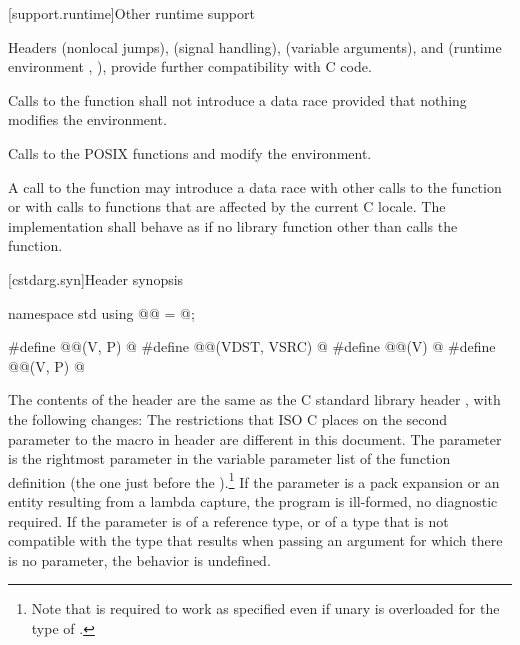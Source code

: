 [support.runtime]{Other runtime support}

\pnum
{}%
%
%
%
%
%
%
Headers
 (nonlocal jumps),
 (signal handling),
 (variable arguments),
and
 (runtime environment , ),
provide further compatibility with C code.

\pnum
Calls to the function
%
 shall not introduce a data
race provided that nothing modifies the environment.
\begin{note} Calls to the POSIX functions
%
 and
%
 modify the
environment. \end{note}

\pnum
A call to the  function
may introduce a data race with other
calls to the  function or with calls to functions that are
affected by the current C locale. The implementation shall behave as if no
library function other than  calls the 
function.

[cstdarg.syn]{Header  synopsis}

%
%
%
%
%
%
\begin{codeblock}
namespace std {
  using @@ = @\seebelow@;
}

#define @@(V, P) @\seebelow@
#define @@(VDST, VSRC) @\seebelow@
#define @@(V) @\seebelow@
#define @@(V, P) @\seebelow@
\end{codeblock}

\pnum
{}%
The contents of the header  are the same as the C
standard library header , with the following changes:
The restrictions that ISO C places on the second parameter to the
%
macro in header
%
are different in this document.
The parameter
is the rightmost parameter in the variable parameter list
of the function definition (the one just before the
).\footnote{Note that
is required to work as specified even if unary
is overloaded for the type of
.}
If the parameter  is a pack expansion or
an entity resulting from a lambda capture,
the program is ill-formed, no diagnostic required.
If the parameter
is of a reference type, or of a type that is not compatible with the
type that results when passing an argument for which there is no
parameter, the behavior is undefined.


